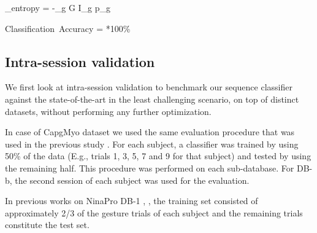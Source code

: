 \documentclass[conference]{IEEEtran}
\begin{document}
{\begin{minipage}{\textwidth}
  \label{eq:multipleentropy}
  \jmath_{\mbox{\tiny entropy}} = -\sum_{g \in G} {\textrm{I}_{g} \ln p_g}

  \label{eq:classification_accuracy}
  \mbox{Classification Accuracy} = *100\%


\subsection{Intra-session validation}

We first look at intra-session validation to benchmark our sequence classifier against the state-of-the-art in the least challenging scenario, on top of distinct datasets, without performing any further optimization.

In case of CapgMyo dataset we used the same evaluation procedure that was used in the previous study \cite{b18}.
For each subject, a classifier was trained by using 50\% of the data (E.g., trials 1, 3, 5, 7 and 9 for that subject) and tested by using the remaining half.
This procedure was performed on each sub-database. For DB-b, the second session of each subject was used for the evaluation.

In previous works on NinaPro DB-1 \cite{b23}, \cite{b18}, the training set consisted of approximately 2/3 of the gesture trials of each subject and the remaining trials constitute the test set.


\end{minipage}}
\end{document}
